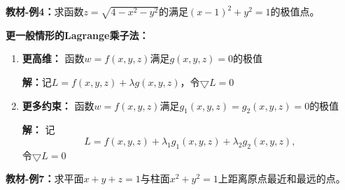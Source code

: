 {\bf 教材-例4：}求函数$z=\sqrt{4-x^2-y^2}$的满足$(x-1)^2+y^2=1$的极值点。

\begin{center}
\end{center}

{\bf 更一般情形的Lagrange乘子法：}

\begin{enumerate}[(1)]
  \setlength{\itemindent}{1cm}
  \item {\bf 更高维：} 函数$w=f(x,y,z)$满足$g(x,y,z)=0$的极值 
  
  {\bf 解：}记$L=f(x,y,z)+\lambda g(x,y,z)$，令$\bigtriangledown L=0$ 
  \item {\bf 更多约束：} 函数$w=f(x,y,z)$满足$g_1(x,y,z)=g_2(x,y,z)=0$的极值 
  
  {\bf 解：} 记
  $$L=f(x,y,z)+\lambda_1 g_1(x,y,z)+\lambda_2 g_2(x,y,z),$$
  令$\bigtriangledown L=0$
\end{enumerate}

{\bf 教材-例7：}求平面$x+y+z=1$与柱面$x^2+y^2=1$上距离原点最近和最远的点。

